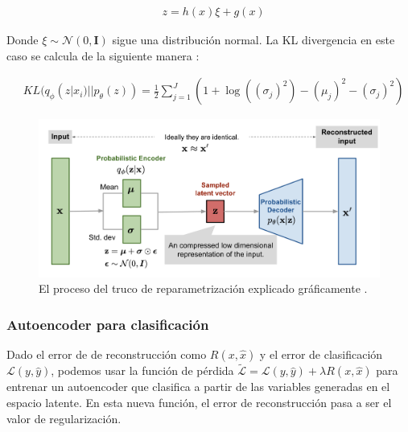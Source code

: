 \begin{align}
	&z = h(x) \xi + g(x)
\end{align}

Donde $\xi \sim \mathcal{N}(0,\mathbf{I})$ sigue una distribución normal. La KL divergencia en este caso se calcula de la siguiente manera \cite{kingma2014autoencoding}:

\begin{align}
	&KL(q_\phi(z|x_i)||p_\theta(z)) = \frac{1}{2} \sum^J_{j=1} \left( 1 + \log ((\sigma_j)^2) - (\mu_j)^2 - (\sigma_j)^2 \right)
\end{align}

\begin{figure}[H]
	\includegraphics[scale=0.3]{imagenes/03_Estado_del_arte/vae-gaussian.png}
	\centering
	\caption{El proceso del truco de reparametrización explicado gráficamente \cite{weng2018VAE}.}
	\label{fig:gaussianvae}
\end{figure}

\subsubsection{Autoencoder para clasificación}

Dado el error de de reconstrucción como $R(x,\hat{x})$ y el error de clasificación $\mathcal{L}(y,\hat{y})$, podemos usar la función de pérdida $\tilde{\mathcal{L}} = \mathcal{L}(y,\hat{y}) + \lambda R(x,\hat{x})$ para entrenar un autoencoder que clasifica a partir de las variables generadas en el espacio latente. En esta nueva función, el error de reconstrucción pasa a ser el valor de regularización.

